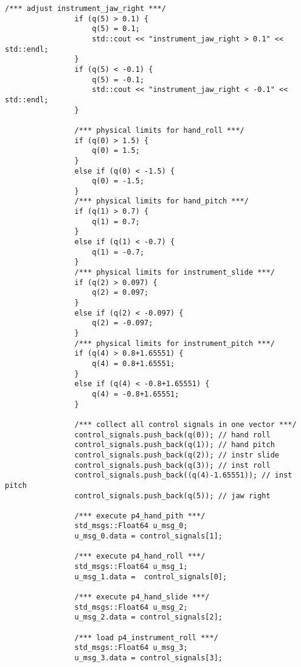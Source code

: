\begin{lstlisting}[language=gedit]
                /*** adjust instrument_jaw_right ***/
                if (q(5) > 0.1) {
                    q(5) = 0.1;
                    std::cout << "instrument_jaw_right > 0.1" << std::endl;
                }
                if (q(5) < -0.1) {
                    q(5) = -0.1;
                    std::cout << "instrument_jaw_right < -0.1" << std::endl;
                }
   
                /*** physical limits for hand_roll ***/
                if (q(0) > 1.5) {
                    q(0) = 1.5;
                }
                else if (q(0) < -1.5) {
                    q(0) = -1.5;
                } 
                /*** physical limits for hand_pitch ***/
                if (q(1) > 0.7) {
                    q(1) = 0.7;
                }
                else if (q(1) < -0.7) {
                    q(1) = -0.7;
                } 
                /*** physical limits for instrument_slide ***/
                if (q(2) > 0.097) {
                    q(2) = 0.097;
                }
                else if (q(2) < -0.097) {
                    q(2) = -0.097;
                }
                /*** physical limits for instrument_pitch ***/
                if (q(4) > 0.8+1.65551) {
                    q(4) = 0.8+1.65551;
                }
                else if (q(4) < -0.8+1.65551) {
                    q(4) = -0.8+1.65551;
                }
            
                /*** collect all control signals in one vector ***/
                control_signals.push_back(q(0)); // hand roll
                control_signals.push_back(q(1)); // hand pitch
                control_signals.push_back(q(2)); // instr slide
                control_signals.push_back(q(3)); // inst roll
                control_signals.push_back((q(4)-1.65551)); // inst pitch
                control_signals.push_back(q(5)); // jaw right

                /*** execute p4_hand_pith ***/
                std_msgs::Float64 u_msg_0;
                u_msg_0.data = control_signals[1];

                /*** execute p4_hand_roll ***/
                std_msgs::Float64 u_msg_1;
                u_msg_1.data =  control_signals[0];

                /*** execute p4_hand_slide ***/
                std_msgs::Float64 u_msg_2;
                u_msg_2.data = control_signals[2];

                /*** load p4_instrument_roll ***/
                std_msgs::Float64 u_msg_3;
                u_msg_3.data = control_signals[3];
                

\end{lstlisting}
